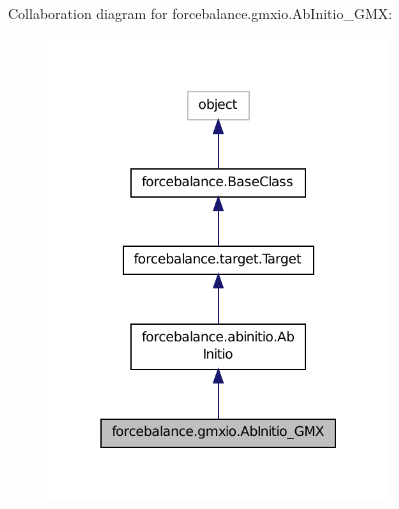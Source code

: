 Collaboration diagram for forcebalance.\-gmxio.\-Ab\-Initio\-\_\-\-G\-M\-X\-:
\nopagebreak
\begin{figure}[H]
\begin{center}
\leavevmode
\includegraphics[width=256pt]{classforcebalance_1_1gmxio_1_1AbInitio__GMX__coll__graph}
\end{center}
\end{figure}
